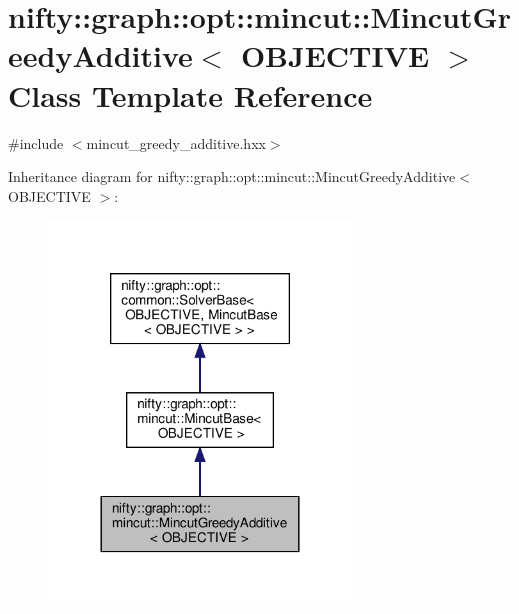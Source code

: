 \hypertarget{classnifty_1_1graph_1_1opt_1_1mincut_1_1MincutGreedyAdditive}{}\section{nifty\+:\+:graph\+:\+:opt\+:\+:mincut\+:\+:Mincut\+Greedy\+Additive$<$ O\+B\+J\+E\+C\+T\+I\+VE $>$ Class Template Reference}
\label{classnifty_1_1graph_1_1opt_1_1mincut_1_1MincutGreedyAdditive}


{\ttfamily \#include $<$mincut\+\_\+greedy\+\_\+additive.\+hxx$>$}



Inheritance diagram for nifty\+:\+:graph\+:\+:opt\+:\+:mincut\+:\+:Mincut\+Greedy\+Additive$<$ O\+B\+J\+E\+C\+T\+I\+VE $>$\+:
\nopagebreak
\begin{figure}[H]
\begin{center}
\leavevmode
\includegraphics[width=228pt]{classnifty_1_1graph_1_1opt_1_1mincut_1_1MincutGreedyAdditive__inherit__graph}
\end{center}
\end{figure}


